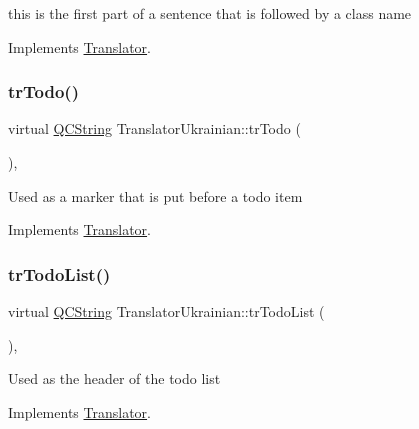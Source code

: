 this is the first part of a sentence that is followed by a class name 

Implements \mbox{\hyperlink{class_translator}{Translator}}.

\mbox{\label{class_translator_ukrainian_aad7bb6cb01c61c2001aaaf1089131caa}} 
\subsubsection{\texorpdfstring{trTodo()}{trTodo()}}
{\footnotesize\ttfamily virtual \mbox{\hyperlink{class_q_c_string}{Q\+C\+String}} Translator\+Ukrainian\+::tr\+Todo (\begin{DoxyParamCaption}{ }\end{DoxyParamCaption})\hspace{0.3cm}{\ttfamily [inline]}, {\ttfamily [virtual]}}

Used as a marker that is put before a todo item 

Implements \mbox{\hyperlink{class_translator}{Translator}}.

\mbox{\label{class_translator_ukrainian_aaf6af6df3491312e1690fafe43ad681e}} 
\subsubsection{\texorpdfstring{trTodoList()}{trTodoList()}}
{\footnotesize\ttfamily virtual \mbox{\hyperlink{class_q_c_string}{Q\+C\+String}} Translator\+Ukrainian\+::tr\+Todo\+List (\begin{DoxyParamCaption}{ }\end{DoxyParamCaption})\hspace{0.3cm}{\ttfamily [inline]}, {\ttfamily [virtual]}}

Used as the header of the todo list 

Implements \mbox{\hyperlink{class_translator}{Translator}}.

\mbox{\label{class_translator_ukrainian_a6995777e1d04f65917d8c2fc84e133a8}} 
